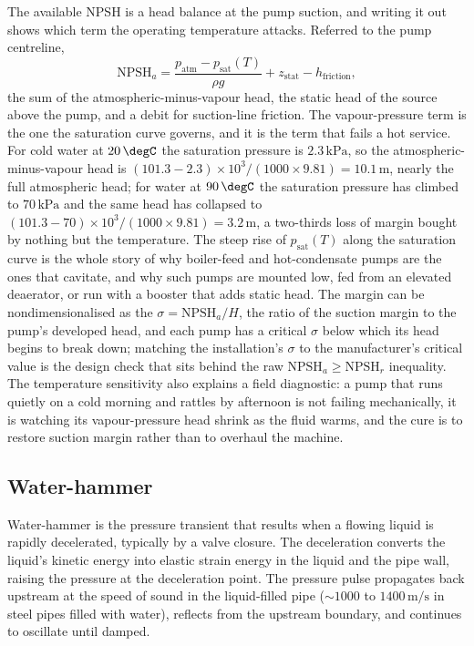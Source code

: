 The available NPSH is a head balance at the pump suction, and writing it out
shows which term the operating temperature attacks. Referred to the pump
centreline,
\[
\text{NPSH}_a = \frac{p_{\text{atm}} - p_{\text{sat}}(T)}{\rho g} +
z_{\text{stat}} - h_{\text{friction}},
\]
the sum of the atmospheric-minus-vapour head, the static head of the source
above the pump, and a debit for suction-line friction. The vapour-pressure term
is the one the saturation curve governs, and it is the term that fails a hot
service. For cold water at $20\,\degC$ the saturation pressure is $2.3\,\text{kPa}$,
so the atmospheric-minus-vapour head is $(101.3 - 2.3)\times 10^3/(1000\times
9.81) = 10.1\,\text{m}$, nearly the full atmospheric head; for water at
$90\,\degC$ the saturation pressure has climbed to $70\,\text{kPa}$ and the same
head has collapsed to $(101.3 - 70)\times 10^3/(1000\times 9.81) = 3.2\,\text{m}$,
a two-thirds loss of margin bought by nothing but the temperature. The steep
rise of $p_{\text{sat}}(T)$ along the saturation curve is the whole story of why
boiler-feed and hot-condensate pumps are the ones that cavitate, and why such
pumps are mounted low, fed from an elevated deaerator, or run with a booster
that adds static head. The margin can be nondimensionalised as the
 $\sigma = \text{NPSH}_a/H$, the ratio of the
suction margin to the pump's developed head, and each pump has a critical
$\sigma$ below which its head begins to break down; matching the installation's
$\sigma$ to the manufacturer's critical value is the design check that sits
behind the raw $\text{NPSH}_a \ge \text{NPSH}_r$ inequality. The temperature
sensitivity also explains a field diagnostic: a pump that runs quietly on a cold
morning and rattles by afternoon is not failing mechanically, it is watching its
vapour-pressure head shrink as the fluid warms, and the cure is to restore
suction margin rather than to overhaul the machine.

\subsection{Water-hammer}

Water-hammer is the pressure transient that results when a flowing
liquid is rapidly decelerated, typically by a valve closure. The
deceleration converts the liquid's kinetic energy into elastic strain
energy in the liquid and the pipe wall, raising the pressure at the
deceleration point. The pressure pulse propagates back upstream at the
speed of sound in the liquid-filled pipe ($\sim 1000$ to $1400\,
\text{m}/\text{s}$ in steel pipes filled with water), reflects from
the upstream boundary, and continues to oscillate until damped.

